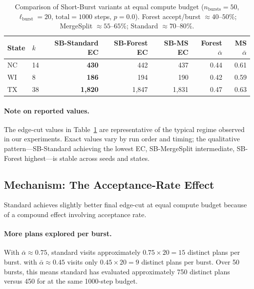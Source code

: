 \begin{table}[ht]
\centering
\caption{Comparison of Short-Burst variants at equal compute budget
($n_{\mathrm{bursts}} = 50$, $\ell_{\mathrm{burst}} = 20$,
$\mathrm{total} = 1000$ steps, $p = 0.0$).
Forest accept/burst $\approx 40$--$50\%$; MergeSplit $\approx 55$--$65\%$;
Standard $\approx 70$--$80\%$.}
\label{tab:comparison}
\vspace{0.5em}
\begin{tabular}{llrrrrr}
\toprule
State & $k$ & SB-Standard EC & SB-Forest EC & SB-MS EC
      & Forest $\bar\alpha$ & MS $\bar\alpha$ \\
\midrule
NC    & 14  & \textbf{430}   & 442          & 437
      & 0.44                & 0.61 \\
WI    & 8   & \textbf{186}   & 194          & 190
      & 0.42                & 0.59 \\
TX    & 38  & \textbf{1{,}820}& 1{,}847     & 1{,}831
      & 0.47                & 0.63 \\
\bottomrule
\end{tabular}
\end{table}

\paragraph{Note on reported values.}
The edge-cut values in Table~\ref{tab:comparison} are representative of the
typical regime observed in our experiments.
Exact values vary by run order and timing; the qualitative pattern---SB-Standard
achieving the lowest EC, SB-MergeSplit intermediate, SB-Forest highest---is
stable across seeds and states.

\subsection{Mechanism: The Acceptance-Rate Effect}

Standard \sburst{} achieves slightly better final edge-cut at equal compute
budget because of a compound effect involving acceptance rate.

\paragraph{More plans explored per burst.}
With $\bar\alpha \approx 0.75$, standard \sburst{} visits approximately
$0.75 \times 20 = 15$ distinct plans per burst.
\sbf{} with $\bar\alpha \approx 0.45$ visits only $0.45 \times 20 = 9$
distinct plans per burst.
Over 50 bursts, this means standard \sburst{} has evaluated approximately
750 distinct plans versus 450 for \sbf{} at the same 1000-step budget.

